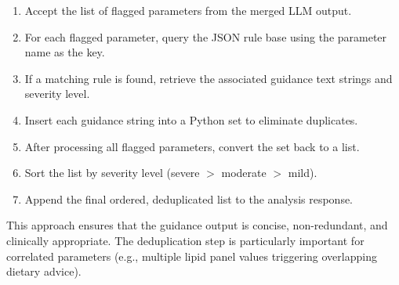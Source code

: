 \begin{enumerate}
    \item Accept the list of flagged parameters from the merged LLM output.
    \item For each flagged parameter, query the JSON rule base using the parameter name as the key.
    \item If a matching rule is found, retrieve the associated guidance text strings and severity level.
    \item Insert each guidance string into a Python set to eliminate duplicates.
    \item After processing all flagged parameters, convert the set back to a list.
    \item Sort the list by severity level (severe $>$ moderate $>$ mild).
    \item Append the final ordered, deduplicated list to the analysis response.
\end{enumerate}

This approach ensures that the guidance output is concise, non-redundant, and clinically appropriate. The deduplication step is particularly important for correlated parameters (e.g., multiple lipid panel values triggering overlapping dietary advice).

